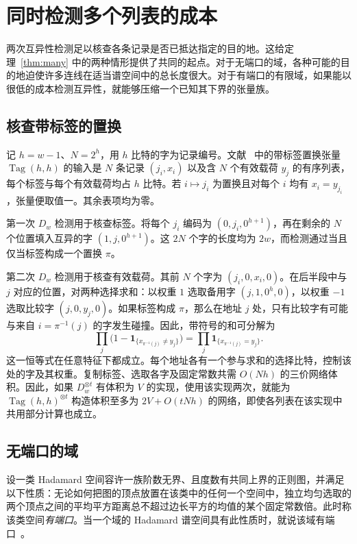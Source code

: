 \section{同时检测多个列表的成本}\label{sec:list}

两次互异性检测足以核查各条记录是否已抵达指定的目的地。这给定理~\ref{thm:many} 中的两种情形提供了共同的起点。对于无端口的域，各种可能的目的地迫使许多连线在适当谱空间中的总长度很大。对于有端口的有限域，如果能以很低的成本检测互异性，就能够压缩一个已知其下界的张量族。

\subsection{核查带标签的置换}

记 \(h=w-1\)、\(N=2^h\)，用 \(h\) 比特的字为记录编号。文献~\cite[定义~]{oaG} 中的带标签置换张量 \(\operatorname{Tag}(h,h)\) 的输入是 \(N\) 条记录 \((j_i,x_i)\) 以及含 \(N\) 个有效载荷 \(y_j\) 的有序列表，每个标签与每个有效载荷均占 \(h\) 比特。若 \(i\mapsto j_i\) 为置换且对每个 \(i\) 均有 \(x_i=y_{j_i}\)，张量便取值一。其余表项均为零。

第一次 \(D_w\) 检测用于核查标签。将每个 \(j_i\) 编码为 \((0,j_i,0^{h+1})\)，再在剩余的 \(N\) 个位置填入互异的字 \((1,j,0^{h+1})\)。这 \(2N\) 个字的长度均为 \(2w\)，而检测通过当且仅当标签构成一个置换 \(\pi\)。

第二次 \(D_w\) 检测用于核查有效载荷。其前 \(N\) 个字为 \((j_i,0,x_i,0)\)。在后半段中与 \(j\) 对应的位置，对两种选择求和：以权重 \(1\) 选取备用字 \((j,1,0^h,0)\)，以权重 \(-1\) 选取比较字 \((j,0,y_j,0)\)。如果标签构成 \(\pi\)，那么在地址 \(j\) 处，只有比较字有可能与来自 \(i=\pi^{-1}(j)\) 的字发生碰撞。因此，带符号的和可分解为
\[
     \prod_j \bigl(1-\mathbf 1_{\{x_{\pi^{-1}(j)}\ne y_j\}}\bigr)
       =\prod_j\mathbf 1_{\{x_{\pi^{-1}(j)}=y_j\}} .
\]
这一恒等式在任意特征下都成立。每个地址各有一个参与求和的选择比特，控制该处的字及其权重。复制标签、选取各字及固定常数共需 \(O(Nh)\) 的三价网络体积。因此，如果 \(D_w^{\otimes t}\) 有体积为 \(V\) 的实现，使用该实现两次，就能为 \(\operatorname{Tag}(h,h)^{\otimes t}\) 构造体积至多为 \(2V+O(tNh)\) 的网络，即使各列表在该实现中共用部分计算也成立。

\subsection{无端口的域}

设一类 Hadamard 空间容许一族阶数无界、且度数有共同上界的正则图，并满足以下性质：无论如何把图的顶点放置在该类中的任何一个空间中，独立均匀选取的两个顶点之间的平均平方距离总不超过边长平方的均值的某个固定常数倍。此时称该类空间\emph{有端口}。当一个域的 Hadamard 谱空间具有此性质时，就说该域有端口~\cite[定义~]{oaG}。

